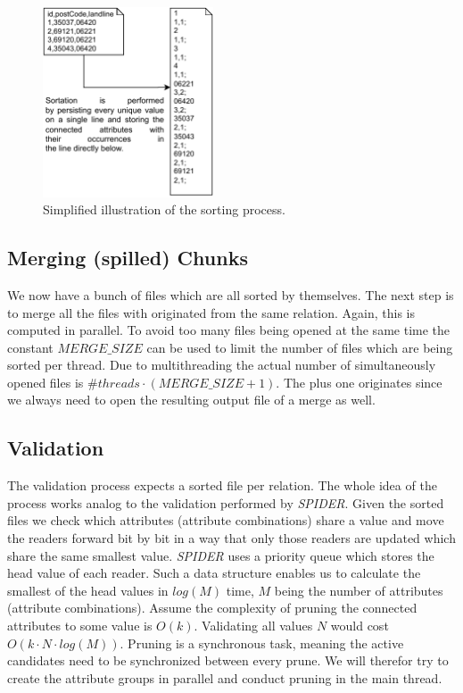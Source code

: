 \begin{figure}[h]
    \centering
    \includegraphics[width=0.45\textwidth]{files/Sorting.pdf}
    \caption{Simplified illustration of the sorting process.}
    \label{fig:sorting}
\end{figure}

\subsection{Merging (spilled) Chunks}
We now have a bunch of files which are all sorted by themselves. The next step is to merge all the files with originated from the same relation. Again, this is computed in parallel. To avoid too many files being opened at the same time the constant $MERGE\_SIZE$ can be used to limit the number of files which are being sorted per thread. Due to multithreading the actual number of simultaneously opened files is $\#threads \cdot (MERGE\_SIZE + 1)$. The plus one originates since we always need to open the resulting output file of a merge as well.

\subsection{Validation}\label{sec:spind_val}
The validation process expects a sorted file per relation. The whole idea of the process works analog to the validation performed by \textit{SPIDER}. Given the sorted files we check which attributes (attribute combinations) share a value and move the readers forward bit by bit in a way that only those readers are updated which share the same smallest value. \textit{SPIDER} uses a priority queue which stores the head value of each reader. Such a data structure enables us to calculate the smallest of the head values in $log(M)$ time, $M$ being the number of attributes (attribute combinations). Assume the complexity of pruning the connected attributes to some value is $O(k)$. Validating all values $N$ would cost $O(k \cdot N \cdot log(M))$. Pruning is a synchronous task, meaning the active candidates need to be synchronized between every prune. We will therefor try to create the attribute groups in parallel and conduct pruning in the main thread.

